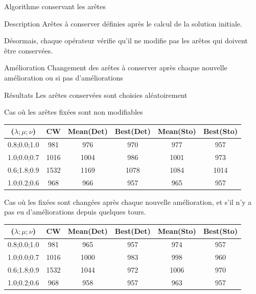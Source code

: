 \documentclass{beamer}
\begin{document}
\begin{frame}{Algorithme conservant les arêtes}
\begin{block}{Description}
Arêtes à conserver définies après le calcul de la solution initiale.

Désormais, chaque opérateur vérifie qu'il ne modifie pas les arêtes qui doivent être conservées.
\end{block}

\begin{exampleblock}{Amélioration}
Changement des arêtes à conserver après chaque nouvelle amélioration ou si pas d'améliorations
\end{exampleblock}

\end{frame}

\begin{frame}{Résultats}
Les arêtes conservées sont choisies aléatoirement

Cas où les arêtes fixées sont non modifiables

\begin{tabular}{|c|c|c|c|c|c|}
   \hline
   ($\lambda;\mu;\nu$) & CW & Mean(Det) & Best(Det) & Mean(Sto) & Best(Sto) \\
   \hline
   0.8;0.0;1.0 & 981 & 976 & 970 & 977 & 957 \\
   \hline
   1.0;0.0;0.7 & 1016 & 1004 & 986 & 1001 & 973\\
   \hline
   0.6;1.8;0.9 & 1532 & 1169 & 1078 & 1084 & 1014\\
   \hline
   1.0;0.2;0.6 & 968 & 966 & 957 & 965 & 957 \\
   \hline
\end{tabular}

Cas où les fixées sont changées après chaque nouvelle amélioration, et s'il n'y a pas eu d'améliorations depuis quelques tours.
\begin{tabular}{|c|c|c|c|c|c|}
   \hline
   ($\lambda;\mu;\nu$) & CW & Mean(Det) & Best(Det) & Mean(Sto) & Best(Sto) \\
   \hline
   0.8;0.0;1.0 & 981 & 965 & 957 & 974 & 957 \\
   \hline
   1.0;0.0;0.7 & 1016 & 1000 & 983 & 998 & 960\\
   \hline
   0.6;1.8;0.9 & 1532 & 1044 & 972 & 1006 & 970\\
   \hline
   1.0;0.2;0.6 & 968 & 958 & 957 & 963 & 957 \\
   \hline
\end{tabular}
\end{frame}
\end{document}
